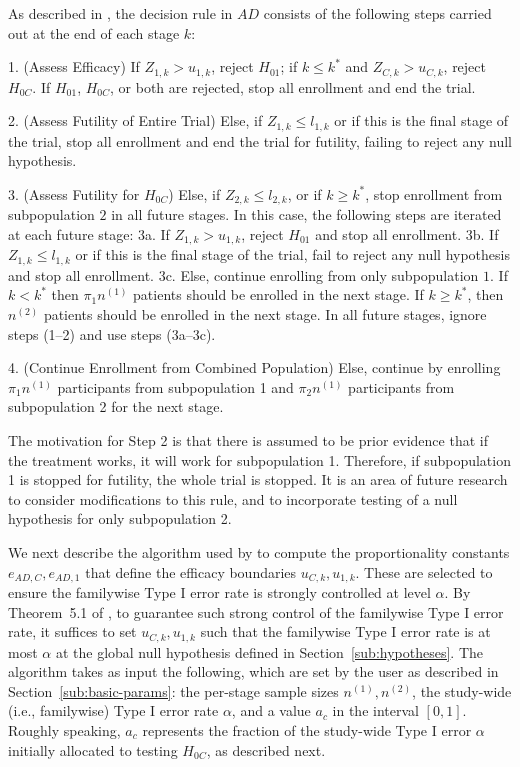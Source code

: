 \documentclass[article]{jss}
\begin{document}
As described in \citep{Rosenblum2013AdaptMISTIE}, the decision rule in $AD$ consists of the following steps carried out at the end of each stage $k$:

\begin{description}
\item 1. (Assess Efficacy) 
 If $Z_{1,k}>u_{1,k}$, reject $H_{01}$;
   if $k\leq k^*$ and  $Z_{C,k} > u_{C,k}$, reject $H_{0C}$. 
 If $H_{01}$, $H_{0C}$, or both  are rejected, stop all enrollment and end the trial.
\item 2. (Assess Futility of Entire Trial) Else, if $Z_{1,k} ≤ l_{1,k}$ or if this is the final stage of the trial, stop all enrollment and end the trial for futility, failing to reject  any null hypothesis.
\item 3. (Assess Futility for $H_{0C}$) Else, if $Z_{2,k} ≤ l_{2,k}$, or if $k\geq k^*$, stop enrollment from subpopulation $2$ in all future stages. In this case, the following steps are iterated at each future stage:
	\subitem  3a. If $Z_{1,k} > u_{1,k}$, reject $H_{01}$ and stop all enrollment.
	\subitem  3b. If $Z_{1,k} ≤ l_{1,k}$ or if this is the final stage of the trial, fail to reject any null hypothesis  and stop all enrollment.
	\subitem  3c. Else, continue enrolling from only subpopulation $1$. If $k < k^*$ then $π_1n^{(1)}$ patients should be enrolled in the next stage. If $k \geq k^*$, then $n^{(2)}$ patients should be enrolled in the next stage. In all future stages, ignore steps (1--2) and use steps (3a--3c).
\item  4. (Continue Enrollment from Combined Population) Else, continue by enrolling $\pi_1 n^{(1)}$ participants from subpopulation 1 and $\pi_2 n^{(1)}$ participants from subpopulation 2 for the next stage.
\end{description}

The motivation for Step 2 is that there is assumed to be prior evidence that if the treatment works, it will work for subpopulation 1. Therefore, if subpopulation 1 is stopped for futility, the whole trial is stopped. It is an area of future research to consider modifications to this rule, and to incorporate testing of a null hypothesis for only subpopulation 2.

We next describe the algorithm used by   to compute the proportionality constants $e_{AD,C}, e_{AD,1}$ that define the efficacy boundaries $u_{C,k},u_{1,k}$. These are selected to ensure the familywise Type I error rate is strongly controlled at level $\alpha$. By Theorem~5.1 of  \citep{Rosenblum2013AdaptMISTIE}, to guarantee such strong control of the familywise Type I error rate, it suffices to set $u_{C,k},u_{1,k}$ such that the familywise Type I error rate is at most $\alpha$ at the global null hypothesis defined in Section~\ref{sub:hypotheses}.
The algorithm takes as input the following, which are set by the user as described in Section~\ref{sub:basic-params}: the per-stage sample sizes $n^{(1)},n^{(2)}$, the study-wide (i.e., familywise) Type I error rate $\alpha$, and a value $a_c$ in the interval $[0,1]$. 
Roughly speaking, $a_c$ represents the fraction of the study-wide Type I error $\alpha$ initially allocated to testing $H_{0C}$, as described next.
\end{document}
